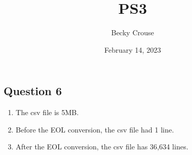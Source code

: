 \documentclass[nobib]{MSword}
\title{PS3}
\author{Becky Crouse}
\date{February 14, 2023}
\begin{document}
\maketitle

\subsection*{Question 6}
\begin{enumerate}
  \item The csv file is 5MB.
  \item Before the EOL conversion, the csv file had 1 line.
  \item After the EOL conversion, the csv file has 36,634 lines.
\end{enumerate}
\end{document}
